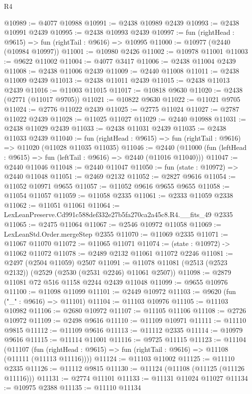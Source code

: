 \begin{lexlean}{R4}
\begin{coremodule}
@10989 := @4077 @10988
@10991 := @2438 @10989 @2439
@10993 := @2438 @10991 @2439
@10995 := @2438 @10993 @2439
@10997 := fun (rightHead : @9615) => fun (rightTail : @9616) => @10995
@11000 := @10977 (@2440 (@10984 @10997))
@11001 := @10980 @2426
@11002 := @10978 @11001
@11003 := @9622 @11002
@11004 := @4077 @3417
@11006 := @2438 @11004 @2439
@11008 := @2438 @11006 @2439
@11009 := @2440 @11008
@11011 := @2438 @11009 @2439
@11013 := @2438 @11011 @2439
@11015 := @2438 @11013 @2439
@11016 := @11003 @11015
@11017 := @10818 @9630
@11020 := @2438 (@2771 (@11017 @9705))
@11021 := @10822 @9630
@11022 := @11021 @9705
@11024 := @2776 @11022 @2439
@11025 := @2775 @11024
@11027 := @2787 @11022 @2439
@11028 := @11025 @11027
@11029 := @2440 @10988
@11031 := @2438 @11029 @2439
@11033 := @2438 @11031 @2439
@11035 := @2438 @11033 @2439
@11040 := fun (rightHead : @9615) => fun (rightTail : @9616) => @11020 (@11028 @11035 @11035)
@11046 := @2440 (@11000 (fun (leftHead : @9615) => fun (leftTail : @9616) => @2440 (@11016 @11040)))
@11047 := @2440 @11046
@11048 := @2440 @11047
@11050 := fun (state : @10972) => @2440 @11048
@11051 := @2469 @2132
@11052 := @2827 @9616
@11054 := @11052 @10971 @9655
@11057 := @11052 @9616 @9655 @9655
@11058 := @11054 @11057
@11059 := @11058 @2335
@11061 := @2333 @11059 @2338
@11062 := @11051 @11061
@11064 := LexLeanPreserve.Cd991c588def332e27b5fa270ca2a45c8.R4.__fits_49 @2335
@11065 := @2475 @11064
@11067 := @2546 @10972 @11058
@11069 := LexLeanStd.Order.mergeStep @2355
@11070 := @11069 @2335
@11071 := @11067 @11070
@11072 := @11065 @11071
@11074 := (state : @10972) -> @11062 @11072
@11078 := @2489 @2132 @11061 @11072 @2246
@11081 := @2497 (@2504 @11059) @2507
@11091 := @11078 @11081 (@2513 (@2523 @2132)) (@2529 (@2530 (@2531 @2246) @11061 @2507))
@11098 := @2879 @11081 @72 @516 @1158 @2244 @2439 @11048
@11099 := @9655 @10976
@11100 := @11098 @11099
@11101 := @2449 @10972
@11103 := @9620 (fun ("_" : @9616) => @11101)
@11104 := @11103 @10976
@11105 := @11103 @10982
@11106 := @2680 @10972
@11107 := @11105 @11106
@11108 := @2726 @10972
@11109 := @2498 @9616
@11110 := @11109 @10971
@11111 := @11110 @9815
@11112 := @11109 @9616
@11113 := @11112 @2335
@11114 := @10979 @9616
@11115 := @11114 @11001
@11116 := @9725 @11115
@11123 := @11104
    (@11107 (fun (rightHead : @9615) => fun (rightTail : @9616) => @11108 (@11111 (@11113 @11116))))
@11124 := @11103 @11002
@11125 := @11110 @2335
@11126 := @11112 @9815
@11130 := @11124 (@11108 (@11125 (@11126 @11116)))
@11131 := @2774 @11101
@11133 := @11131 @11024 @11027
@11134 := @10975 @2388
@11135 := @11110 @11134

\end{coremodule}
\end{lexlean}
